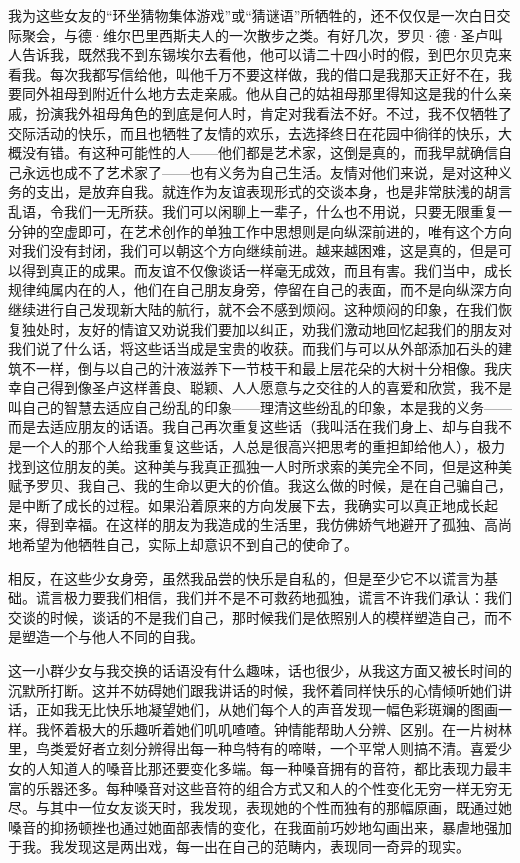 \par 我为这些女友的“环坐猜物集体游戏”或“猜谜语”所牺牲的，还不仅仅是一次白日交际聚会，与德·维尔巴里西斯夫人的一次散步之类。有好几次，罗贝·德·圣卢叫人告诉我，既然我不到东锡埃尔去看他，他可以请二十四小时的假，到巴尔贝克来看我。每次我都写信给他，叫他千万不要这样做，我的借口是我那天正好不在，我要同外祖母到附近什么地方去走亲戚。他从自己的姑祖母那里得知这是我的什么亲戚，扮演我外祖母角色的到底是何人时，肯定对我看法不好。不过，我不仅牺牲了交际活动的快乐，而且也牺牲了友情的欢乐，去选择终日在花园中徜徉的快乐，大概没有错。有这种可能性的人——他们都是艺术家，这倒是真的，而我早就确信自己永远也成不了艺术家了——也有义务为自己生活。友情对他们来说，是对这种义务的支出，是放弃自我。就连作为友谊表现形式的交谈本身，也是非常肤浅的胡言乱语，令我们一无所获。我们可以闲聊上一辈子，什么也不用说，只要无限重复一分钟的空虚即可，在艺术创作的单独工作中思想则是向纵深前进的，唯有这个方向对我们没有封闭，我们可以朝这个方向继续前进。越来越困难，这是真的，但是可以得到真正的成果。而友谊不仅像谈话一样毫无成效，而且有害。我们当中，成长规律纯属内在的人，他们在自己朋友身旁，停留在自己的表面，而不是向纵深方向继续进行自己发现新大陆的航行，就不会不感到烦闷。这种烦闷的印象，在我们恢复独处时，友好的情谊又劝说我们要加以纠正，劝我们激动地回忆起我们的朋友对我们说了什么话，将这些话当成是宝贵的收获。而我们与可以从外部添加石头的建筑不一样，倒与以自己的汁液滋养下一节枝干和最上层花朵的大树十分相像。我庆幸自己得到像圣卢这样善良、聪颖、人人愿意与之交往的人的喜爱和欣赏，我不是叫自己的智慧去适应自己纷乱的印象——理清这些纷乱的印象，本是我的义务——而是去适应朋友的话语。我自己再次重复这些话（我叫活在我们身上、却与自我不是一个人的那个人给我重复这些话，人总是很高兴把思考的重担卸给他人），极力找到这位朋友的美。这种美与我真正孤独一人时所求索的美完全不同，但是这种美赋予罗贝、我自己、我的生命以更大的价值。我这么做的时候，是在自己骗自己，是中断了成长的过程。如果沿着原来的方向发展下去，我确实可以真正地成长起来，得到幸福。在这样的朋友为我造成的生活里，我仿佛娇气地避开了孤独、高尚地希望为他牺牲自己，实际上却意识不到自己的使命了。
\par 相反，在这些少女身旁，虽然我品尝的快乐是自私的，但是至少它不以谎言为基础。谎言极力要我们相信，我们并不是不可救药地孤独，谎言不许我们承认：我们交谈的时候，谈话的不是我们自己，那时候我们是依照别人的模样塑造自己，而不是塑造一个与他人不同的自我。
\par 这一小群少女与我交换的话语没有什么趣味，话也很少，从我这方面又被长时间的沉默所打断。这并不妨碍她们跟我讲话的时候，我怀着同样快乐的心情倾听她们讲话，正如我无比快乐地凝望她们，从她们每个人的声音发现一幅色彩斑斓的图画一样。我怀着极大的乐趣听着她们叽叽喳喳。钟情能帮助人分辨、区别。在一片树林里，鸟类爱好者立刻分辨得出每一种鸟特有的啼啭，一个平常人则搞不清。喜爱少女的人知道人的嗓音比那还要变化多端。每一种嗓音拥有的音符，都比表现力最丰富的乐器还多。每种嗓音对这些音符的组合方式又和人的个性变化无穷一样无穷无尽。与其中一位女友谈天时，我发现，表现她的个性而独有的那幅原画，既通过她嗓音的抑扬顿挫也通过她面部表情的变化，在我面前巧妙地勾画出来，暴虐地强加于我。我发现这是两出戏，每一出在自己的范畴内，表现同一奇异的现实。
